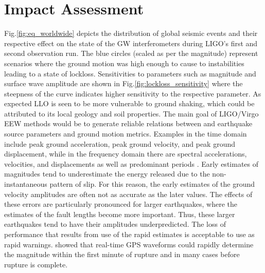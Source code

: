 \documentclass[twocolumn, aps, superscriptaddress]{revtex4}
\begin{document}
\section{Impact Assessment}\label{sec:motivation}
Fig.\ref{fig:eq_worldwide} depicts the distribution of global seismic events and their respective effect on the state of the GW interferometers during LIGO's first and second observation run. The blue circles (scaled as per the magnitude) represent scenarios where the ground motion was high enough to cause to instabilities leading to a state of lockloss. Sensitivities to parameters such as magnitude and surface wave amplitude are shown in Fig.\ref{fig:lockloss_sensitivity} where the steepness of the curve indicates higher sensitivity to the respective parameter. As expected LLO is seen to be more vulnerable to ground shaking, which could be attributed to its local geology and soil properties.
The main goal of LIGO/Virgo EEW methods would be to generate reliable relations between and earthquake source parameters and ground motion metrics. Examples in the time domain include peak ground acceleration, peak ground velocity, and peak
ground displacement, while in the frequency domain there are spectral accelerations, velocities, and displacements as well as predominant periods \cite{Do2003}.  Early estimates of magnitudes tend to underestimate the energy released due to the non-instantaneous pattern of slip.
For this reason, the early estimates of the ground velocity amplitudes are often not as accurate as the later values. 
The effects of these errors are particularly pronounced for larger earthquakes, where the estimates of the fault lengths become more important.
Thus, these larger earthquakes tend to have their amplitudes underpredicted.
The loss of performance that results from use of the rapid estimates is acceptable to use as rapid warnings.
\cite{MeCr2015} showed that real-time GPS waveforms could rapidly determine the magnitude within the first minute of rupture and in many cases before rupture is complete.
\end{document}
